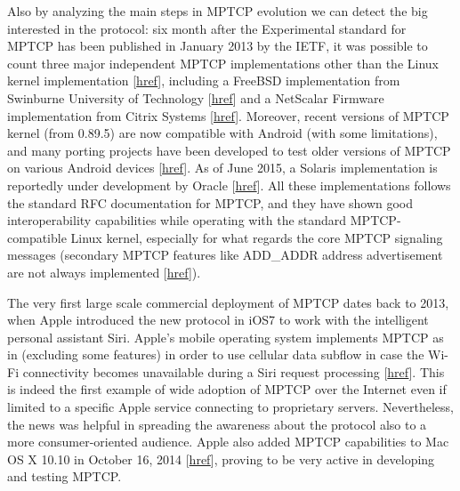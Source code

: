 Also by analyzing the main steps in MPTCP evolution we can detect the big interested in the protocol: six month after the Experimental standard for MPTCP has been published in January 2013 by the IETF, it was possible to count three major independent MPTCP implementations other than the Linux kernel implementation [\href{https://datatracker.ietf.org/doc/draft-eardley-mptcp-implementations-survey/?include_text=1}{href}], including a FreeBSD implementation from Swinburne University of Technology [\href{http://lists.freebsd.org/pipermail/freebsd-net/2013-March/034882.html}{href}] and a NetScalar Firmware implementation from Citrix Systems [\href{https://www.citrix.com/blogs/2013/05/28/maximize-mobile-user-experience-with-netscaler-multipath-tcp/}{href}].
Moreover, recent versions of MPTCP kernel (from 0.89.5) are now compatible with Android (with some limitations), and many porting projects have been developed to test older versions of MPTCP on various Android devices [\href{https://multipath-tcp.org/pmwiki.php?n=Users.Android}{href}].
As of June 2015, a Solaris implementation is reportedly under development by Oracle [\href{https://mailarchive.ietf.org/arch/msg/multipathtcp/ugMIu566McQMn8YCju-CTjW9beY}{href}].
All these implementations follows the standard RFC documentation for MPTCP, and they have shown good interoperability capabilities while operating with the standard MPTCP-compatible Linux kernel, especially for what regards the core MPTCP signaling messages (secondary MPTCP features like ADD\_ADDR address advertisement are not always implemented [\href{https://datatracker.ietf.org/doc/draft-eardley-mptcp-implementations-survey/?include_text=1}{href}]).


The very first large scale commercial deployment of MPTCP dates back to 2013, when Apple introduced the new protocol in iOS7 to work with the intelligent personal assistant Siri. Apple's mobile operating system implements MPTCP as in  (excluding some features) in order to use cellular data subflow in case the Wi-Fi connectivity becomes unavailable during a Siri request processing [\href{https://support.apple.com/en-us/HT201373}{href}]. This is indeed the first example of wide adoption of MPTCP over the Internet even if limited to a specific Apple service connecting to proprietary servers. Nevertheless, the news was helpful in spreading the awareness about the protocol also to a more consumer-oriented audience. Apple also added MPTCP capabilities to Mac OS X 10.10 in October 16, 2014 [\href{http://labs.neohapsis.com/2014/10/20/mptcp-roams-free-by-default-os-x-yosemite/}{href}], proving to be very active in developing and testing MPTCP.


